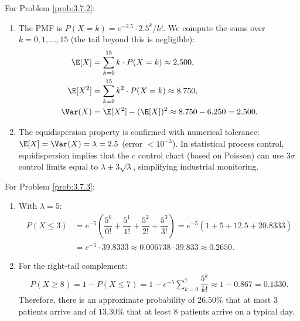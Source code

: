 \begin{solucion}
	\label{sol:3.7.2}
	For Problem \ref{prob:3.7.2}:
	\begin{enumerate}
		\item The PMF is $P(X = k) = e^{-2.5} \cdot 2.5^{k} / k!$. We compute the sums over $k = 0, 1, \dots, 15$ (the tail beyond this is negligible):
		\begin{align*}
			\E[X] &= \sum_{k=0}^{15} k \cdot P(X=k) \approx 2.500, \\
			\E[X^{2}] &= \sum_{k=0}^{15} k^{2} \cdot P(X=k) \approx 8.750, \\
			\Var(X) &= \E[X^{2}] - (\E[X])^{2} \approx 8.750 - 6.250 = 2.500.
		\end{align*}
		\item The equidispersion property is confirmed with numerical tolerance: $\E[X] = \Var(X) = \lambda = 2.5$ (error $< 10^{-3}$). In statistical process control, equidispersion implies that the $c$ control chart (based on Poisson) can use $3\sigma$ control limits equal to $\lambda \pm 3\sqrt{\lambda}$, simplifying industrial monitoring.
	\end{enumerate}
\end{solucion}

\begin{solucion}
	\label{sol:3.7.3}
	For Problem \ref{prob:3.7.3}:
	\begin{enumerate}
		\item With $\lambda = 5$:
		\begin{align*}
			P(X \le 3) &= e^{-5}\left(\dfrac{5^{0}}{0!} + \dfrac{5^{1}}{1!} + \dfrac{5^{2}}{2!} + \dfrac{5^{3}}{3!}\right) = e^{-5}\left(1 + 5 + 12.5 + 20.833\overline{3}\right) \\
			&= e^{-5} \cdot 39.833\overline{3} \approx 0.006738 \cdot 39.833 \approx 0.2650.
		\end{align*}
		\item For the right-tail complement:
		\begin{align*}
			P(X \ge 8) = 1 - P(X \le 7) = 1 - e^{-5} \sum_{k=0}^{7} \dfrac{5^{k}}{k!} \approx 1 - 0.867 = 0.1330.
		\end{align*}
		Therefore, there is an approximate probability of $26.50\%$ that at most $3$ patients arrive and of $13.30\%$ that at least $8$ patients arrive on a typical day.
	\end{enumerate}
\end{solucion}

